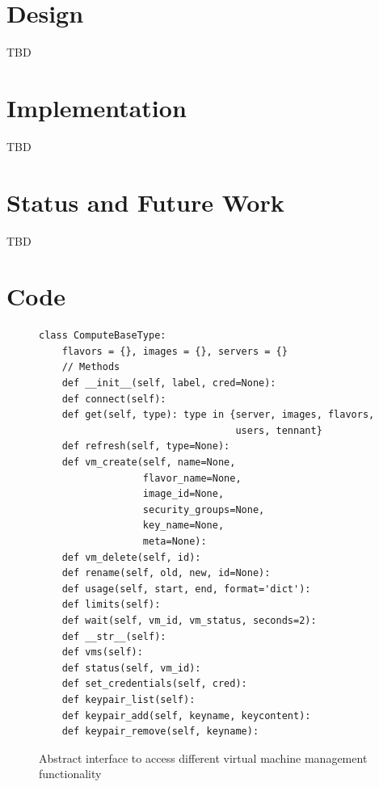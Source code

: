 \documentclass{tex/sig-alternate-2013}
\begin{document}
\section{Design}\label{S:design}

TBD

\section{Implementation}\label{S:implementation}

TBD

\section{Status and Future Work}

TBD


\section{Code}

\begin{figure}[htb]
\begin{small}
\begin{verbatim}
class ComputeBaseType:
    flavors = {}, images = {}, servers = {}
    // Methods
    def __init__(self, label, cred=None):
    def connect(self):
    def get(self, type): type in {server, images, flavors, 
                                  users, tennant}
    def refresh(self, type=None):
    def vm_create(self, name=None,
                  flavor_name=None,
                  image_id=None,
                  security_groups=None,
                  key_name=None,
                  meta=None):
    def vm_delete(self, id):
    def rename(self, old, new, id=None):
    def usage(self, start, end, format='dict'):
    def limits(self):
    def wait(self, vm_id, vm_status, seconds=2):
    def __str__(self):
    def vms(self):
    def status(self, vm_id):
    def set_credentials(self, cred):
    def keypair_list(self):
    def keypair_add(self, keyname, keycontent):
    def keypair_remove(self, keyname):
\end{verbatim}
\end{small}
\vspace{-12pt}
\caption{Abstract interface to access different virtual machine
  management functionality}
\end{figure}
\end{document}
